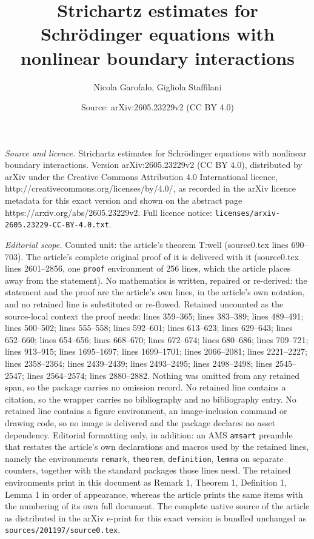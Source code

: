 \documentclass[10pt,a4paper]{amsart}
\title{Strichartz estimates for Schr\"odinger equations with nonlinear boundary interactions}
\author{Nicola Garofalo, Gigliola Staffilani}
\date{Source: arXiv:2605.23229v2 (CC BY 4.0)}
\begin{document}
\maketitle

\noindent\emph{Source and licence.} Strichartz estimates for Schr\"odinger equations with nonlinear boundary interactions. Version arXiv:2605.23229v2 (CC BY 4.0), distributed by arXiv under the Creative Commons Attribution 4.0 International licence, http://creativecommons.org/licenses/by/4.0/, as recorded in the arXiv licence metadata for this exact version and shown on the abstract page https://arxiv.org/abs/2605.23229v2. Full licence notice: \texttt{licenses/arxiv-2605.23229-CC-BY-4.0.txt}.\par\smallskip

\noindent\textit{Editorial scope.} Counted unit: the article's theorem T:well (source0.tex lines 690--703). The article's complete original proof of it is delivered with it (source0.tex lines 2601--2856, one \texttt{proof} environment of 256 lines, which the article places away from the statement). No mathematics is written, repaired or re-derived: the statement and the proof are the article's own lines, in the article's own notation, and no retained line is substituted or re-flowed.  Retained uncounted as the source-local context the proof needs: lines 359--365; lines 383--389; lines 489--491; lines 500--502; lines 555--558; lines 592--601; lines 613--623; lines 629--643; lines 652--660; lines 654--656; lines 668--670; lines 672--674; lines 680--686; lines 709--721; lines 913--915; lines 1695--1697; lines 1699--1701; lines 2066--2081; lines 2221--2227; lines 2358--2364; lines 2439--2439; lines 2493--2495; lines 2498--2498; lines 2545--2547; lines 2564--2574; lines 2880--2882.  Nothing was omitted from any retained span, so the package carries no omission record.  No retained line contains a citation, so the wrapper carries no bibliography and no bibliography entry.  No retained line contains a figure environment, an image-inclusion command or drawing code, so no image is delivered and the package declares no asset dependency.  Editorial formatting only, in addition: an AMS \texttt{amsart} preamble that restates the article's own declarations and macros used by the retained lines, namely the environments \texttt{remark}, \texttt{theorem}, \texttt{definition}, \texttt{lemma} on separate counters, together with the standard packages those lines need.  The retained environments print in this document as Remark 1, Theorem 1, Definition 1, Lemma 1 in order of appearance, whereas the article prints the same items with the numbering of its own full document.  The complete native source of the article as distributed in the arXiv e-print for this exact version is bundled unchanged as \texttt{sources/201197/source0.tex}.
\end{document}
